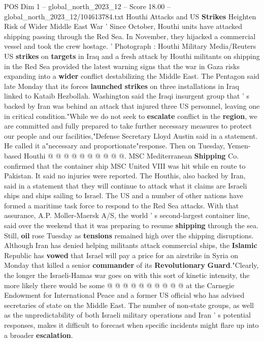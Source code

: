 \begin{textsample}{POS Dim 1 – global\_north\_2023\_12 – Score 18.00 – global\_north\_2023\_12/104613784.txt}  \label{ex:f1_pos_258}
Houthi Attacks and US \textbf{Strikes} Heighten Risk of Wider Middle East War ' Since October, Houthi units have attacked shipping passing through the Red Sea.
In November, they hijacked a commercial vessel and took the crew hostage. ' Photograph : Houthi Military Media/Reuters US \textbf{strikes} on \textbf{targets} in Iraq and a fresh attack by Houthi militants on shipping in the Red Sea provided the latest warning signs that the war in Gaza risks expanding into a \textbf{wider} conflict destabilizing the Middle East.
The Pentagon said late Monday that its forces \textbf{launched} \textbf{strikes} on three installations in Iraq linked to Kataib Hezbollah.
Washington said the Iraqi insurgent group that ' s backed by Iran was behind an attack that injured three US personnel, leaving one in critical condition."While we do not seek to \textbf{escalate} conflict in the \textbf{region}, we are committed and fully prepared to take further necessary measures to protect our people and our facilities,"Defense Secretary Lloyd Austin said in a statement.
He called it a"necessary and proportionate"response.
Then on Tuesday, Yemen-based Houthi @ @ @ @ @ @ @ @ @ @.
MSC Mediterranean \textbf{Shipping} Co. confirmed that the container ship MSC United VIII was hit while en route to Pakistan.
It said no injuries were reported.
The Houthis, also backed by Iran, said in a statement that they will continue to attack what it claims are Israeli ships and ships sailing to Israel.
The US and a number of other nations have formed a maritime task force to respond to the Red Sea attacks.
With that assurance, A.P.
Moller-Maersk A/S, the world ' s second-largest container line, said over the weekend that it was preparing to resume \textbf{shipping} through the sea.
Still, \textbf{oil} rose Tuesday as \textbf{tensions} remained high over the shipping disruptions.
Although Iran has denied helping militants attack commercial ships, the \textbf{Islamic} Republic has \textbf{vowed} that Israel will pay a price for an airstrike in Syria on Monday that killed a senior \textbf{commander} of its \textbf{Revolutionary} \textbf{Guard}."Clearly, the longer the Israeli-Hamas war goes on with this sort of kinetic intensity, the more likely there would be some @ @ @ @ @ @ @ @ @ @ at the Carnegie Endowment for International Peace and a former US official who has advised secretaries of state on the Middle East.
The number of non-state groups, as well as the unpredictability of both Israeli military operations and Iran ' s potential responses, makes it difficult to forecast when specific incidents might flare up into a broader \textbf{escalation}.

\end{textsample}

